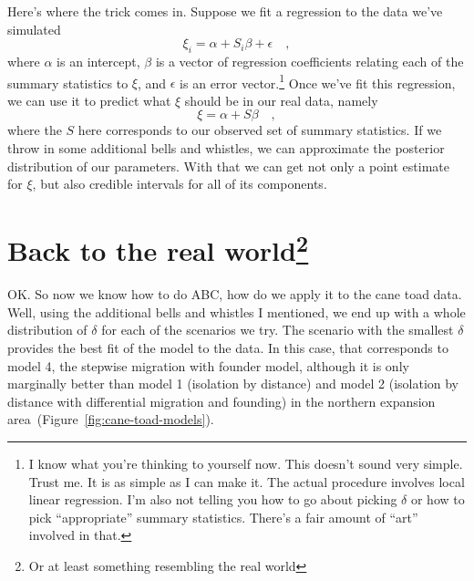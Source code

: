 Here's where the trick comes in. Suppose we fit a regression to the
data we've simulated
\[
\xi_i = \alpha + S_i\beta + \epsilon \quad ,
\]
where $\alpha$ is an intercept, $\beta$ is a vector of regression
coefficients relating each of the summary statistics to $\xi$, and
$\epsilon$ is an error vector.\footnote{I know what you're thinking to
  yourself now. This doesn't sound very simple. Trust me. It is as
  simple as I can make it. The actual procedure involves local linear
  regression. I'm also not telling you how to go about picking
  $\delta$ or how to pick ``appropriate'' summary statistics. There's
  a fair amount of ``art'' involved in that.} Once we've fit this
regression, we can use it to predict what $\xi$ should be in our real
data, namely
\[
\xi = \alpha + S\beta \quad ,
\]
where the $S$ here corresponds to our observed set of summary
statistics. If we throw in some additional bells and whistles, we can
approximate the posterior distribution of our parameters. With that we
can get not only a point estimate for $\xi$, but also credible
intervals for all of its components.

\section*{Back to the real world\footnote{Or at least something
    resembling the real world}}

OK. So now we know how to do ABC, how do we apply it to the cane toad
data. Well, using the additional bells and whistles I mentioned, we
end up with a whole distribution of $\delta$ for each of the scenarios
we try. The scenario with the smallest $\delta$ provides the best fit
of the model to the data. In this case, that corresponds to model 4,
the stepwise migration with founder model, although it is only
marginally better than model 1 (isolation by distance) and model 2
(isolation by distance with differential migration and founding) in
the northern expansion area~(Figure~\ref{fig:cane-toad-models}).

